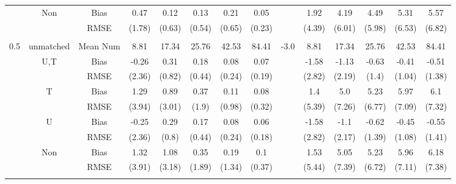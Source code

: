 \begin{tabular}{@{\extracolsep{5pt}}lc|cccccc|lccccc}
 & Non & Bias & 0.47 & 0.12 & 0.13 & 0.21 & 0.05 &  & 1.92 & 4.19 & 4.49 & 5.31 & 5.57 \\
 &  & RMSE & (1.78) & (0.63) & (0.54) & (0.65) & (0.23) &  & (4.39) & (6.01) & (5.98) & (6.53) & (6.82) \\
 &  &  &  &  &  &  &  &  &  &  &  &  &  \\
0.5 & unmatched & Mean Num & 8.81 & 17.34 & 25.76 & 42.53 & 84.41 & -3.0 & 8.81 & 17.34 & 25.76 & 42.53 & 84.41 \\
 & U,T & Bias & -0.26 & 0.31 & 0.18 & 0.08 & 0.07 &  & -1.58 & -1.13 & -0.63 & -0.41 & -0.51 \\
 &  & RMSE & (2.36) & (0.82) & (0.44) & (0.24) & (0.19) &  & (2.82) & (2.19) & (1.4) & (1.04) & (1.38) \\
 & T & Bias & 1.29 & 0.89 & 0.37 & 0.11 & 0.08 &  & 1.4 & 5.0 & 5.23 & 5.97 & 6.1 \\
 &  & RMSE & (3.94) & (3.01) & (1.9) & (0.98) & (0.32) &  & (5.39) & (7.26) & (6.77) & (7.09) & (7.32) \\
 & U & Bias & -0.25 & 0.29 & 0.17 & 0.08 & 0.06 &  & -1.58 & -1.1 & -0.62 & -0.45 & -0.55 \\
 &  & RMSE & (2.36) & (0.8) & (0.44) & (0.24) & (0.18) &  & (2.82) & (2.17) & (1.39) & (1.08) & (1.41) \\
 & Non & Bias & 1.32 & 1.08 & 0.35 & 0.19 & 0.1 &  & 1.53 & 5.05 & 5.23 & 5.96 & 6.18 \\
 &  & RMSE & (3.91) & (3.18) & (1.89) & (1.34) & (0.37) &  & (5.44) & (7.39) & (6.72) & (7.11) & (7.38) \\
 &  &  &  &  &  &  &  &  &  &  &  &  &  \\
\hline 
\bottomrule 
\end{tabular}

